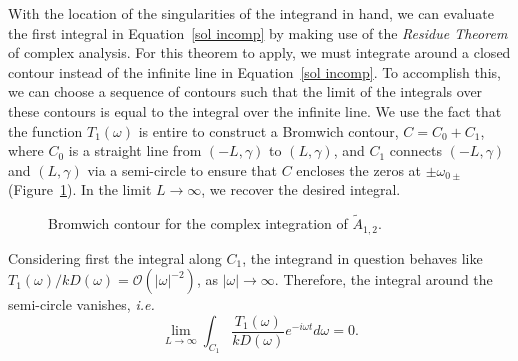 \documentclass[12pt, draft]{../style-files/ociamthesis}
\begin{document}
With the location of the singularities of the integrand in hand, we can evaluate the first integral in Equation~\eqref{sol incomp} by making use of the \textit{Residue Theorem} of complex analysis. For this theorem to apply, we must integrate around a closed contour instead of the infinite line in Equation~\eqref{sol incomp}. To accomplish this, we can choose a sequence of contours such that the limit of the integrals over these contours is equal to the integral over the infinite line. We use the fact that the function $T_1(\omega)$ is entire to construct a Bromwich contour, $C = C_0 + C_1$, where $C_0$ is a straight line from $(-L, \gamma)$ to $(L, \gamma)$, and $C_1$ connects $(-L, \gamma)$ and $(L, \gamma)$ via a semi-circle to ensure that $C$ encloses the zeros at $\pm\omega_{0\pm}$ (Figure~\ref{fig: brom cont incomp}). In the limit $L \to \infty$, we recover the desired integral.

\begin{figure}
	\centering
	\caption{Bromwich contour for the complex integration of $\tilde{A}_{1,2}$.}
	\label{fig: brom cont incomp}
\end{figure}
Considering first the integral along $C_1$, the integrand in question behaves like $T_1(\omega)/kD(\omega) = \mathcal{O}(|\omega|^{-2})$, as $|\omega| \to \infty$. Therefore, the integral around the semi-circle vanishes, \textit{i.e.}
\begin{equation}
\lim_{L \to \infty} \int_{C_1} \frac{T_1(\omega)}{kD(\omega)} e^{-i\omega t} d\omega = 0.
\end{equation}
\end{document}
